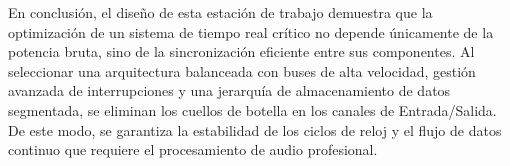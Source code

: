 \documentclass[12pt,a4paper]{article}
\begin{document}
\vspace{1cm} 
En conclusión, el diseño de esta estación de trabajo demuestra que la optimización de un sistema de tiempo real crítico no depende únicamente de la potencia bruta, sino de la sincronización eficiente entre sus componentes. Al seleccionar una arquitectura balanceada con buses de alta velocidad, gestión avanzada de interrupciones y una jerarquía de almacenamiento de datos segmentada, se eliminan los cuellos de botella en los canales de Entrada/Salida. De este modo, se garantiza la estabilidad de los ciclos de reloj y el flujo de datos continuo que requiere el procesamiento de audio profesional.
\end{document}
